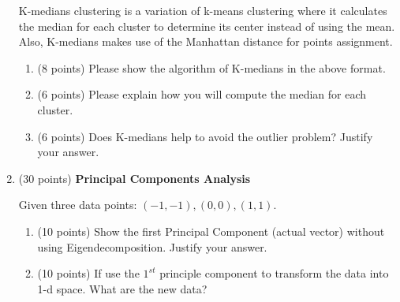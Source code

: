 \documentclass[11pt]{article}
\begin{document}
\begin{enumerate}
    K-medians clustering is a variation of k-means clustering
    where it calculates the median for each cluster to determine
    its center instead of using the mean. Also, K-medians makes
    use of the Manhattan distance for points assignment.
    
    \begin{enumerate}
        \item (8 points) Please show the algorithm of K-medians
        in the above format.


        \item (6 points) Please explain how you will compute the median
        for each cluster.


        \item (6 points) Does K-medians help to avoid the outlier
        problem? Justify your answer.

    \end{enumerate}
    

    \item (30 points) \textbf{ Principal Components Analysis}
    
    Given three data points: $(-1, -1), (0,0), (1,1)$.

    \begin{enumerate}
        \item (10 points) Show the first Principal Component
        (actual vector) without using Eigendecomposition. Justify
        your answer.

        
        \item (10 points) If use the $1^{st}$ principle component
        to transform the data into 1-d space. What are the new
        data?


    \end{enumerate}



\end{enumerate}
\end{document}
